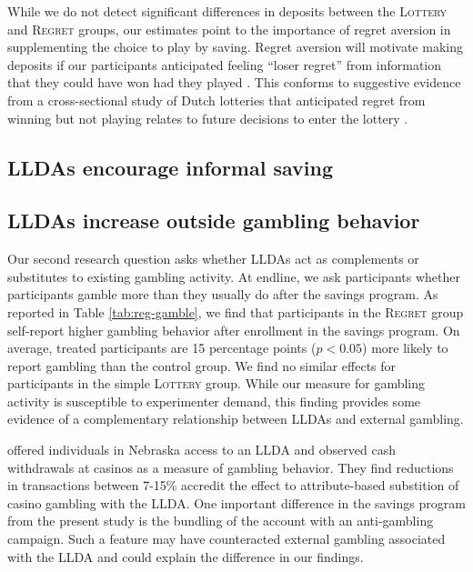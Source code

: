 \documentclass[12pt]{article}
\begin{document}

		While we do not detect significant differences in deposits between the \textsc{Lottery} and \textsc{Regret} groups, our estimates point to the importance of regret aversion in supplementing the choice to play by saving. Regret aversion will motivate making deposits if our participants anticipated feeling ``loser regret'' from information that they could have won had they played . This conforms to suggestive evidence from a cross-sectional study of Dutch lotteries that anticipated regret from winning but not playing relates to future decisions to enter the lottery .


	\subsection{LLDAs encourage informal saving}


	\subsection{LLDAs increase outside gambling behavior}

		Our second research question asks whether LLDAs act as complements or substitutes to existing gambling activity. At endline, we ask participants whether participants gamble more than they usually do after the savings program. As reported in Table \ref{tab:reg-gamble}, we find that participants in the \textsc{Regret} group self-report higher gambling behavior after enrollment in the savings program. On average, treated participants are 15 percentage points ($p < 0.05$) more likely to report gambling than the control group. We find no similar effects for participants in the simple \textsc{Lottery} group. While our measure for gambling activity is susceptible to experimenter demand, this finding provides some evidence of a complementary relationship between LLDAs and external gambling.

		 offered individuals in Nebraska access to an LLDA and observed cash withdrawals at casinos as a measure of gambling behavior. They find reductions in transactions between 7-15\% accredit the effect to attribute-based substition of casino gambling with the LLDA. One important difference in the savings program from the present study is the bundling of the account with an anti-gambling campaign. Such a feature may have counteracted external gambling associated with the LLDA and could explain the difference in our findings.
\end{document}
